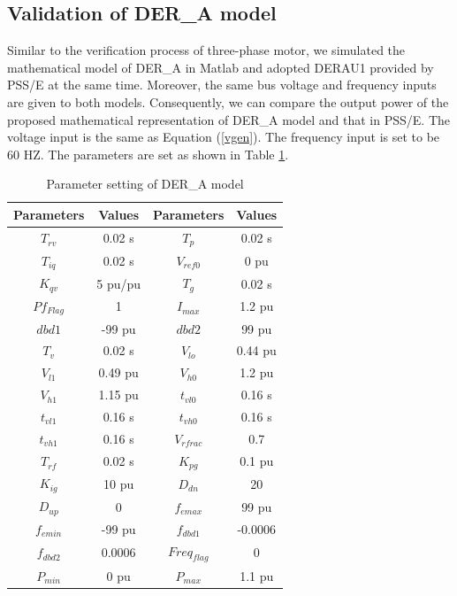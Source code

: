 \documentclass[journal]{IEEEtran}
\begin{document}
	\subsection{Validation of DER\_A model}
	Similar to the verification process of three-phase motor, we simulated the mathematical model of DER\_A in Matlab and adopted DERAU1 provided by PSS/E at the same time. Moreover, the same bus voltage and frequency inputs are given to both models. Consequently, we can compare the output power of the proposed mathematical representation of DER\_A model and that in PSS/E. The voltage input is the same as Equation (\ref{vgen}). The frequency input is set to be 60 HZ. The parameters are set as shown in Table \ref{table3}.
	\renewcommand\arraystretch{1.2}
	\begin{table}
		\caption{Parameter setting of DER\_A model \cite{EPRI2019}}
		\label{table3}
		\setlength{\tabcolsep}{12.7pt}
		\begin{tabular}{|c|c|c|c|}	
			\hline
			Parameters&Values&Parameters&Values\\
			\hline
			$T_{rv}$& 
			0.02 s&
			$T_p$& 
			0.02 s\\
			$T_{iq}$& 
			0.02 s&
			$V_{ref0}$& 
			0 pu\\
			$K_{qv}$& 
			5 pu/pu&
			$T_g$& 
			0.02 s\\
			$Pf_{Flag}$& 
			1&
			$I_{max}$& 
			1.2 pu\\
			$dbd1$& 
			-99 pu&
			$dbd2$& 
			99 pu\\
			$T_{v}$& 
			0.02 s&
			$V_{lo}$& 
			0.44 pu\\
			$V_{l1}$& 
			0.49 pu&
			$V_{h0}$& 
			1.2 pu\\
			$V_{h1}$& 
			1.15 pu&
			$t_{vl0}$& 
			0.16 s\\
			$t_{vl1}$& 
			0.16 s&
			$t_{vh0}$& 
			0.16 s\\
			$t_{vh1}$& 
			0.16 s&
			$V_{rfrac}$& 
			0.7\\
			$T_{rf}$& 
			0.02 s &
			$K_{pg}$& 
			0.1 pu\\
			$K_{ig}$& 
			10 pu&
			$D_{dn}$& 
			20 \\
			$D_{up}$& 
			0 &
			$f_{emax}$& 
			99 pu\\
			$f_{emin}$& 
			-99 pu&
			$f_{dbd1}$& 
			-0.0006\\
			$f_{dbd2}$& 
			0.0006&
			$Freq_{flag}$& 
			0\\
			$P_{min}$& 
			0 pu&
			$P_{max}$& 
			1.1 pu\\

\end{tabular}
\end{table}
\end{document}
